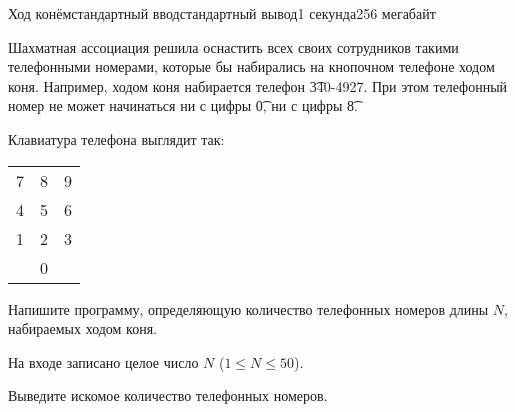 \begin{problem}{Ход конём}{стандартный ввод}{стандартный вывод}{1 секунда}{256 мегабайт}

Шахматная ассоциация решила оснастить всех своих сотрудников такими
телефонными номерами, которые бы набирались на кнопочном телефоне
ходом коня. Например, ходом коня набирается телефон \t{340-4927}. При
этом телефонный номер не может начинаться ни с цифры \t{0}, ни с цифры \t{8}.

Клавиатура телефона выглядит так:

\begin{tabular}{ l c r }
7 & 8 & 9 \\
4 & 5 & 6 \\
1 & 2 & 3 \\
& 0 & \\
\end{tabular}

Напишите программу, определяющую количество телефонных номеров 
длины $N$, набираемых ходом коня.

\InputFile
На входе записано целое число $N$ ($1 \le N \le 50$).

\OutputFile
Выведите искомое количество телефонных номеров.

\Example

\begin{example}
%
\end{example}

\end{problem}

